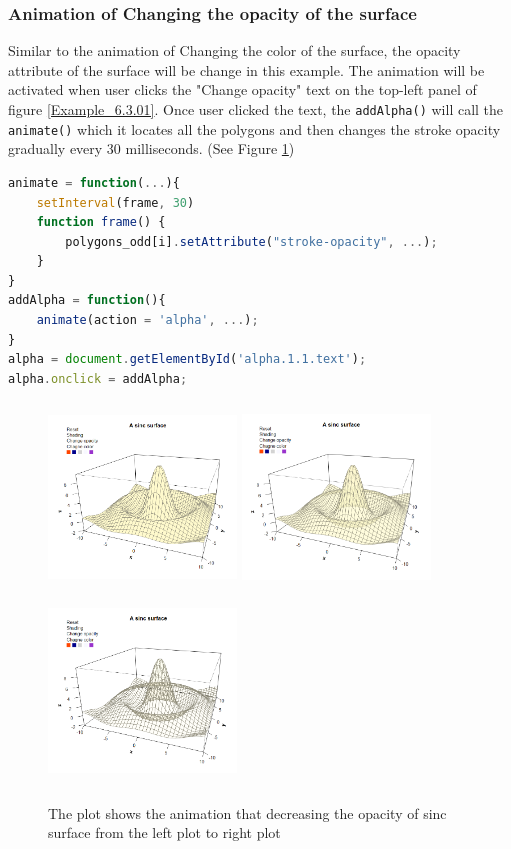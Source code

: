 \documentclass{report}
\begin{document}
\newpage
\subsubsection*{Animation of Changing the opacity of the surface}
Similar to the animation of Changing the color of the surface, the opacity attribute of the surface will be change in this example. The animation will be activated when user clicks the "Change opacity" text on the top-left panel of figure \ref{Example_6.3.01}. Once user clicked the text, the \texttt{addAlpha()} will call the \texttt{animate()} which it locates all the polygons and then changes the stroke opacity gradually every 30 milliseconds. (See Figure \ref{Example_6.3.2})
\begin{lstlisting}[language = JavaScript]
animate = function(...){
    setInterval(frame, 30)
    function frame() {
        polygons_odd[i].setAttribute("stroke-opacity", ...);
    }
}
addAlpha = function(){
    animate(action = 'alpha', ...);
}
alpha = document.getElementById('alpha.1.1.text');
alpha.onclick = addAlpha; 
\end{lstlisting}

\begin{figure}[h]
	\begin{center}
		\includegraphics[height = 5cm, width = 5cm]{figure/svg/origin_1.PNG}
		\includegraphics[height = 5cm, width = 5cm]{figure/svg/opacity_2.PNG}
		\includegraphics[height = 5cm, width = 5cm]{figure/svg/opacity_3.PNG}
		\caption{The plot shows the animation that decreasing the opacity of sinc surface from the left plot to right plot}
		\label{Example_6.3.2}
	\end{center}
\end{figure}
\end{document}
